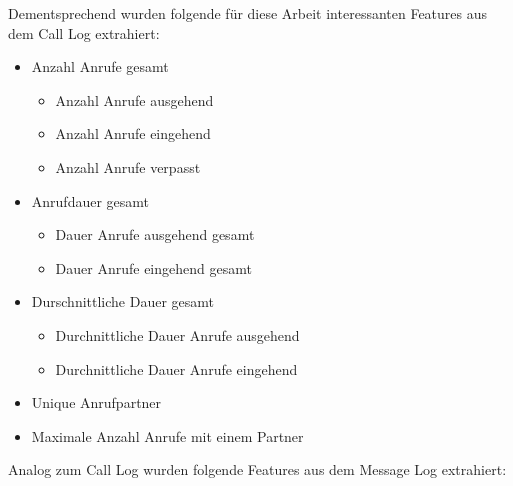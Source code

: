 Dementsprechend wurden folgende für diese Arbeit interessanten Features aus dem Call Log extrahiert:

\begin{itemize}
    \item Anzahl Anrufe gesamt
    \begin{itemize}
        \item Anzahl Anrufe ausgehend
        \item Anzahl Anrufe eingehend
        \item Anzahl Anrufe verpasst
    \end{itemize}

    \item Anrufdauer gesamt
    \begin{itemize}
        \item Dauer Anrufe ausgehend gesamt
        \item Dauer Anrufe eingehend gesamt
    \end{itemize}

    \item Durschnittliche Dauer gesamt
    \begin{itemize}
        \item Durchnittliche Dauer Anrufe ausgehend
        \item Durchnittliche Dauer Anrufe eingehend
    \end{itemize}

    \item Unique Anrufpartner
    \item Maximale Anzahl Anrufe mit einem Partner

\end{itemize}

Analog zum Call Log wurden folgende Features aus dem Message Log extrahiert:

